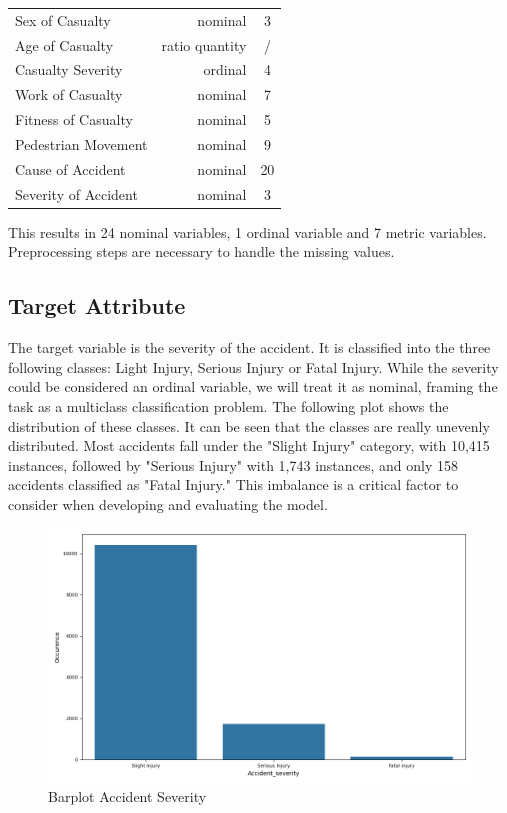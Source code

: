 \documentclass{article}
\begin{document}
\begin{table}[H]
{\begin{tabular}{l|r|c}
            Sex of Casualty & nominal & 3 \\
            Age of Casualty & ratio quantity & /\\
            Casualty Severity & ordinal & 4 \\
            Work of Casualty & nominal & 7\\
            Fitness of Casualty & nominal & 5 \\
            Pedestrian Movement & nominal & 9\\
            Cause of Accident & nominal & 20\\
            Severity of Accident & nominal & 3
        \end{tabular}}
\end{table}

This results in 24 nominal variables, 1 ordinal variable and 7 metric variables. Preprocessing steps are necessary to handle the missing values.

\subsection{Target Attribute}

The target variable is the severity of the accident. It is classified into the three following classes: Light Injury, Serious Injury or Fatal Injury. While the severity could be considered an ordinal variable, we will treat it as nominal, framing the task as a multiclass classification problem. The following plot shows the distribution of these classes. It can be seen that the classes are really unevenly distributed. Most accidents fall under the "Slight Injury" category, with 10,415 instances, followed by "Serious Injury" with 1,743 instances, and only 158 accidents classified as "Fatal Injury." This imbalance is a critical factor to consider when developing and evaluating the model.

\begin{figure}[H]
\centering
\includegraphics[width=0.5\linewidth]{Accident_severity.png}
\caption{\label{fig:hist:price}Barplot Accident Severity}
\end{figure}
\end{document}
